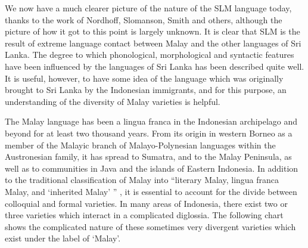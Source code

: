 We now have a much clearer picture of the nature of the SLM language today, thanks to the work of Nordhoff, Slomanson, Smith and others, although the picture of how it got to this point is largely unknown. It is clear that SLM is the result of extreme language contact between Malay and the other languages of Sri Lanka. The degree to which phonological, morphological and syntactic features have been influenced by the languages of Sri Lanka has been described quite well. It is useful, however, to have some idea of the language which was originally brought to Sri Lanka by the Indonesian immigrants, and for this purpose, an understanding of the diversity of Malay varieties is helpful.

The Malay language has been a lingua franca in the Indonesian archipelago and beyond for at least two thousand years. From its origin in western Borneo as a member of the Malayic branch of Malayo-Polynesian languages within the Austronesian family, it has spread to Sumatra, and to the Malay Peninsula, as well as to communities in Java and the islands of Eastern Indonesia. In addition to the traditional classification of Malay into ``literary Malay, lingua franca Malay, and `inherited Malay' '' \citep[673]{AdelaarEtAl1996}, it is essential to account for the divide between colloquial and formal varieties. In many areas of Indonesia, there exist two or three varieties which interact in a complicated diglossia. The following chart shows the complicated nature of these sometimes very divergent varieties which exist under the label of `Malay'.

